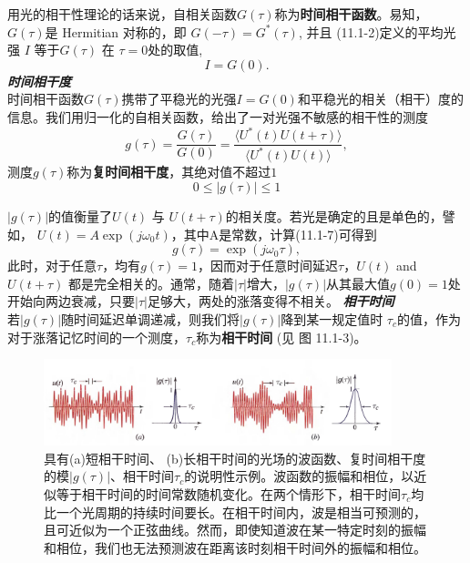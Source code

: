 \documentclass[UTF8]{ctexart}
\numberwithin{figure}{subsection}
\numberwithin{table}{subsection}
\begin{document}
\par 用光的相干性理论的话来说，自相关函数$ G(\tau) $称为\textbf{时间相干函数}。易知， $ G(\tau) $是 Hermitian 对称的，即 $ G(-\tau) = G^\ast (\tau) $, 并且 (11.1-2)定义的平均光强 $ I $ 等于$ G(\tau) $ 在 $ \tau =0 $处的取值,
\begin{equation}
I = G(0).
\end{equation}
\bigbreak\noindent\textcolor{ksc}{\textbf{\textsl{时间相干度}}}\\
时间相干函数$ G(\tau) $携带了平稳光的光强$ I = G(0) $和平稳光的相关（相干）度的信息。我们用归一化的自相关函数，给出了一对光强不敏感的相干性的测度
\begin{equation}
g(\tau) = \frac{G(\tau)}{G(0)} = \frac{\langle U^\ast (t)U(t+\tau) \rangle}{\langle U^\ast (t)U(t) \rangle},
\end{equation}
测度$g(\tau)$称为\textbf{复时间相干度}，其绝对值不超过$1$
\begin{equation}
0\leq \lvert g(\tau) \rvert \leq 1
\end{equation}
\par $ \lvert g(\tau) \rvert $的值衡量了$ U(t) $ 与 $ U(t+\tau) $的相关度。若光是确定的且是单色的，譬如， $ U(t) =A \exp(j\omega_0 t) $，其中A是常数，计算(11.1-7)可得到
\begin{equation}
g(\tau) = \exp(j\omega_0 \tau),
\end{equation} 
此时，对于任意$ \tau $，均有$ g(\tau) = 1$，因而对于任意时间延迟$ \tau $，$ U(t) $ and $ U(t+\tau) $ 都是完全相关的。通常，随着$ \lvert\tau\rvert $增大，$ \lvert g(\tau) \rvert $从其最大值$ g(0) = 1 $处开始向两边衰减，只要$ \lvert\tau\rvert $足够大，两处的涨落变得不相关。
\bigbreak\noindent\textcolor{ksc}{\textbf{\textsl{相干时间}}}\\
若$\lvert g(\tau) \rvert $随时间延迟单调递减，则我们将$\lvert g(\tau) \rvert $降到某一规定值时 $ \tau_c $的值，作为对于涨落记忆时间的一个测度，$ \tau_c $称为\textbf{相干时间} (见 图 11.1-3)。
\begin{figure}[H]
\centering
\includegraphics[width=0.9\textwidth]{11_1_3.PNG}
\caption{具有(a)短相干时间、 (b)长相干时间的光场的波函数、复时间相干度的模$\lvert g(\tau) \rvert $、相干时间$ \tau_c$的说明性示例。波函数的振幅和相位，以近似等于相干时间的时间常数随机变化。在两个情形下，相干时间$ \tau_c $均比一个光周期的持续时间要长。在相干时间内，波是相当可预测的，且可近似为一个正弦曲线。然而，即使知道波在某一特定时刻的振幅和相位，我们也无法预测波在距离该时刻相干时间外的振幅和相位。}
\label{fig: 11_1_3}
\end{figure}
\end{document}
